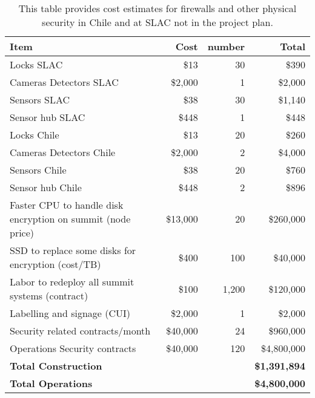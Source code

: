 \tiny \begin{longtable} {|p{}|r|r|r|} \caption{This table provides cost estimates for firewalls and other physical security in Chile and at SLAC not in the project plan. \label{tab:firewalls}}\\ 
\hline 
\textbf{Item}&\textbf{Cost}&\textbf{number}&\textbf{Total} \\ \hline
{Locks SLAC}&{\$13}&{30}&{\$390} \\ \hline
{Cameras Detectors  SLAC}&{\$2,000}&{1}&{\$2,000} \\ \hline
{Sensors SLAC}&{\$38}&{30}&{\$1,140} \\ \hline
{Sensor hub SLAC}&{\$448}&{1}&{\$448} \\ \hline
{Locks Chile}&{\$13}&{20}&{\$260} \\ \hline
{Cameras Detectors Chile}&{\$2,000}&{2}&{\$4,000} \\ \hline
{Sensors Chile}&{\$38}&{20}&{\$760} \\ \hline
{Sensor hub Chile}&{\$448}&{2}&{\$896} \\ \hline
{Faster CPU to handle disk encryption on summit (node price)}&{\$13,000}&{20}&{\$260,000} \\ \hline
{SSD to replace some disks for encryption (cost/TB)}&{\$400}&{100}&{\$40,000} \\ \hline
{Labor to redeploy all summit systems (contract)}&{\$100}&{1,200}&{\$120,000} \\ \hline
{Labelling and signage (CUI)}&{\$2,000}&{1}&{\$2,000} \\ \hline
{Security related contracts/month}&{\$40,000}&{24}&{\$960,000} \\ \hline
{Operations Security contracts}&{\$40,000}&{120}&{\$4,800,000} \\ \hline
\textbf{Total Construction}&\textbf{}&\textbf{}&\textbf{\$1,391,894} \\ \hline
\textbf{Total Operations}&\textbf{}&\textbf{}&\textbf{\$4,800,000} \\ \hline
\end{longtable} \normalsize
